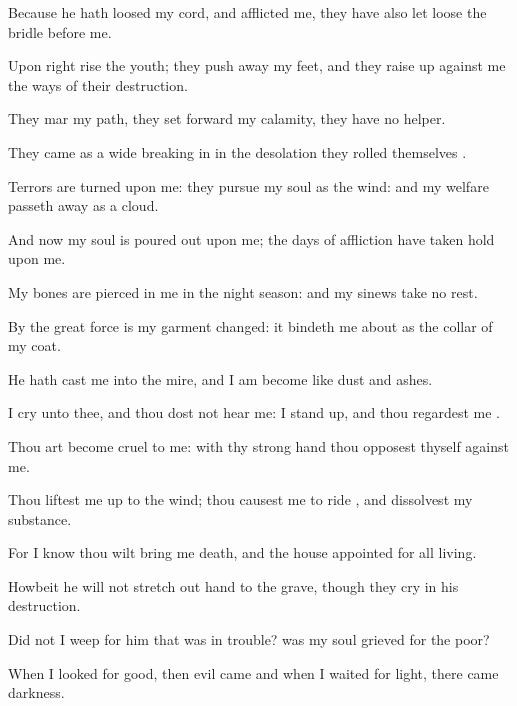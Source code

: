 {Because he hath
loosed my
cord, and
afflicted me, they have also let
loose the
bridle
before me.

Upon
{}
right
{}
rise the
youth; they push
away my
feet, and they raise
up against me the
ways of their
destruction.

They
mar my
path, they set
forward my
calamity, they have no
helper.

They
came
{} as a
wide
breaking in
{}
in the
desolation they
rolled themselves
{}.


\par }{\PP {}Terrors are
turned upon me: they
pursue my
soul as the
wind: and my
welfare passeth
away as a
cloud.

And now my
soul is poured
out upon me; the
days of
affliction have taken
hold upon me.

My
bones are
pierced in me in the night
season: and my
sinews take no
rest.

By the
great
force
{} is my
garment
changed: it bindeth me
about as the
collar of my
coat.

He hath
cast me into the
mire, and I am become
like
dust and
ashes.

I
cry unto thee, and thou dost not
hear me: I stand
up, and thou
regardest me
{}.

Thou art
become
cruel to me: with thy
strong
hand thou
opposest thyself against me.

Thou liftest me
up to the
wind; thou causest me to
ride
{}, and
dissolvest my
substance.

For I
know
{} thou wilt
bring me
{}
death, and
{} the
house
appointed for all
living.

Howbeit he will not stretch
out
{}
hand to the
grave, though they
cry in his
destruction.

Did not I
weep for him that was in
trouble? was
{} my
soul
grieved for the
poor?

When I
looked for
good, then
evil
came
{} and when I
waited for
light, there
came
darkness.

}
